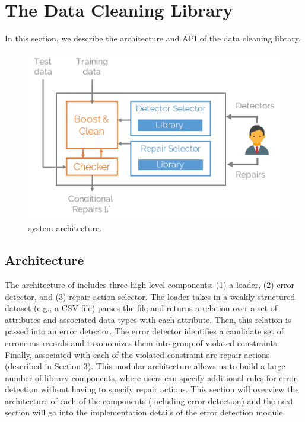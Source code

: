 \section{The Data Cleaning Library}
 In this section, we describe the architecture and API of the data cleaning library. 
 
\begin{figure}
\centering
\includegraphics[width=0.8\columnwidth]{figures/arch.pdf}
\caption{\sys system architecture.}
\label{f:arch}
\end{figure}

\subsection{Architecture}
The architecture of \sys includes three high-level components: (1) a loader, (2) error detector, and (3) repair action selector.
The loader takes in a weakly structured dataset (e.g., a CSV file) parses the file and returns a relation over a set of attributes and associated data types with each attribute.
Then, this relation is passed into an error detector.
The error detector identifies a candidate set of erroneous records and taxonomizes them into group of violated constraints.
Finally, associated with each of the violated constraint are repair actions (described in Section 3).
This modular architecture allows us to build a large number of library components, where users can specify additional rules for error detection without having to specify repair actions.
This section will overview the architecture of each of the components (including error detection) and the next section will go into the implementation details of the error detection module.

